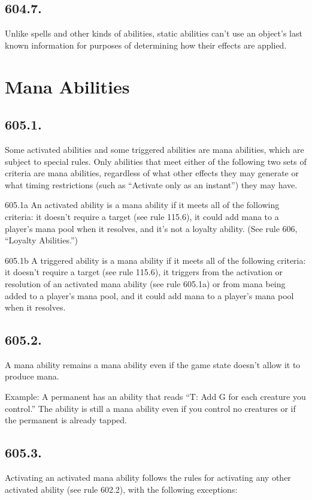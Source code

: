 \subsection*{604.7.}
Unlike spells and other kinds of abilities, static abilities can’t use an object’s last known information for purposes of determining how their effects are applied.

\section{Mana Abilities}
\subsection*{605.1.}
Some activated abilities and some triggered abilities are mana abilities, which are subject to special rules. Only abilities that meet either of the following two sets of criteria are mana abilities, regardless of what other effects they may generate or what timing restrictions (such as “Activate only as an instant”) they may have.

605.1a An activated ability is a mana ability if it meets all of the following criteria: it doesn’t require a target (see rule 115.6), it could add mana to a player’s mana pool when it resolves, and it’s not a loyalty ability. (See rule 606, “Loyalty Abilities.”)

605.1b A triggered ability is a mana ability if it meets all of the following criteria: it doesn’t require a target (see rule 115.6), it triggers from the activation or resolution of an activated mana ability (see rule 605.1a) or from mana being added to a player’s mana pool, and it could add mana to a player’s mana pool when it resolves.

\subsection*{605.2.}
A mana ability remains a mana ability even if the game state doesn’t allow it to produce mana.

Example: A permanent has an ability that reads “{T}: Add {G} for each creature you control.” The ability is still a mana ability even if you control no creatures or if the permanent is already tapped.

\subsection*{605.3.}
Activating an activated mana ability follows the rules for activating any other activated ability (see rule 602.2), with the following exceptions:


